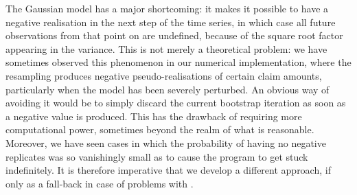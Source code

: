 \documentclass[a4paper]{book}
\begin{document}
The Gaussian model has a major shortcoming: it makes it possible to have a negative realisation in the next step of the time series, in which case all future observations from that point on are undefined, because of the square root factor appearing in the variance. This is not merely a theoretical problem: we have sometimes observed this phenomenon in our numerical implementation, where the resampling produces negative pseudo-realisations of certain claim amounts, particularly when the model has been severely perturbed. An obvious way of avoiding it would be to simply discard the current bootstrap iteration as soon as a negative value is produced. This has the drawback of requiring more computational power, sometimes beyond the realm of what is reasonable. Moreover, we have seen cases in which the probability of having no negative replicates was so vanishingly small as to cause the program to get stuck indefinitely. It is therefore imperative that we develop a different approach, if only as a fall-back in case of problems with .
\end{document}
